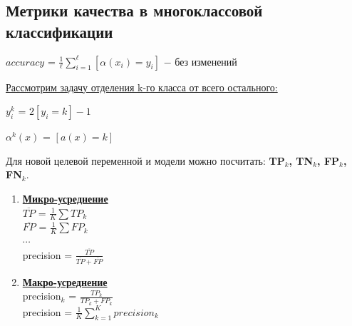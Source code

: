     \subsection{Метрики качества в многоклассовой классификации}

        \begin{center}
        \large
            $accuracy$ = $\frac{1}{\ell}\sum\limits_{i = 1}^\ell[\alpha(x_i) = y_i]$ $-$ без изменений
        \end{center}

        \underline{Рассмотрим задачу отделения k-го класса от всего остального:}\\

        \begin{center}
            $y_i^k$ = $2[y_i = k] - 1$
        \end{center}
        \begin{center}
            $\alpha^k(x)$ = $[a(x) = k]$
        \end{center}
        Для новой целевой переменной и модели можно посчитать: \textbf{TP$_k$, TN$_k$, FP$_k$, FN$_k$}.\\

        \begin{enumerate}
            \item \underline{\textbf{Микро-усреднение}}\\

                $\overline{TP}$ = $\frac{1}{K}\sum\limits TP_k$\\

                $\overline{FP}$ = $\frac{1}{K}\sum\limits FP_k$\\

                $\cdots$\\

                precision = $\frac{\overline{TP}}{\overline{TP} + \overline{FP}}$\\


            \item \underline{\textbf{Макро-усреднение}}\\

                precision$_k$ = $\frac{TP_k}{TP_k + FP_k}$\\

                precision = $\frac{1}{K}\sum\limits_{k = 1}^K precision_k$\\

        \end{enumerate}

